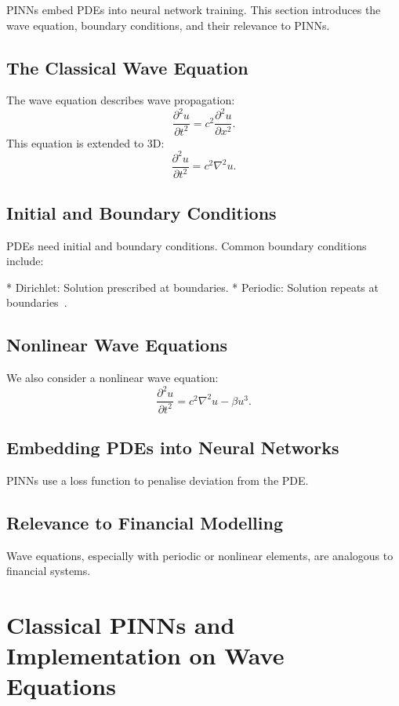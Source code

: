 \documentclass[12pt,a4paper]{article}
\begin{document}
PINNs embed PDEs into neural network training. This section introduces the wave equation, boundary conditions, and their relevance to PINNs.

\subsection{The Classical Wave Equation}

The wave equation describes wave propagation:
\[
\frac{\partial^2 u}{\partial t^2} = c^2 \frac{\partial^2 u}{\partial x^2}.
\]
This equation is extended to 3D:
\[
\frac{\partial^2 u}{\partial t^2} = c^2 \nabla^2 u.
\]

\subsection{Initial and Boundary Conditions}

PDEs need initial and boundary conditions. Common boundary conditions include:

* Dirichlet: Solution prescribed at boundaries.
* Periodic: Solution repeats at boundaries~\cite{zhu2022periodic}.

\subsection{Nonlinear Wave Equations}

We also consider a nonlinear wave equation:
\[
\frac{\partial^2 u}{\partial t^2} = c^2 \nabla^2 u - \beta u^3.
\]

\subsection{Embedding PDEs into Neural Networks}

PINNs use a loss function to penalise deviation from the PDE.

\subsection{Relevance to Financial Modelling}

Wave equations, especially with periodic or nonlinear elements, are analogous to financial systems.

\section{Classical PINNs and Implementation on Wave Equations}
\end{document}
